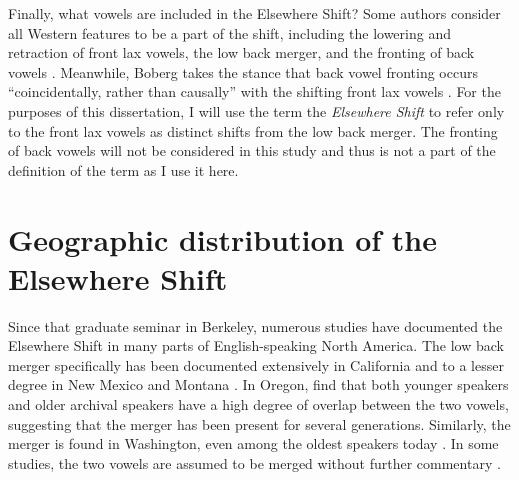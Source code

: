 Finally, what vowels are included in the Elsewhere Shift? Some authors consider all Western features to be a part of the shift, including the lowering and retraction of front lax vowels, the low back merger, and the fronting of back vowels \citep{eckert_2004, eckert_2011, podesva_2011, podesva_etal_2015, donofrio_etal_2017_pads, donofrio_etal_2019}. Meanwhile, Boberg takes the stance that back vowel fronting occurs ``coincidentally, rather than causally'' with the shifting front lax vowels \citet[12]{boberg_2019}. For the purposes of this dissertation, I will use the term the \textit{Elsewhere Shift} to refer only to the front lax vowels as distinct shifts from the low back merger. The fronting of back vowels will not be considered in this study and thus is not a part of the definition of the term as I use it here.




\section{Geographic distribution of the Elsewhere Shift}
\label{sec:geography_of_elsewhere_shift}

Since that graduate seminar in Berkeley, numerous studies have documented the Elsewhere Shift in many parts of English-speaking North America. The low back merger specifically has been documented extensively in California \citep{moonwomon_1991_diss, hagiwara_2005, holland_2014_diss} and to a lesser degree in New Mexico \citep{brumbaugh_koops_2017_pads} and Montana \citep[122]{bar_el_etal_2017}. In Oregon, \citet{mclarty_etal_2016} find that both younger speakers and older archival speakers have a high degree of overlap between the two vowels, suggesting that the merger has been present for several generations. Similarly, the merger is found in Washington, even among the oldest speakers today \citep{wassink_2015, wassink_2016_pads}. In some studies, the two vowels are assumed to be merged without further commentary \citep{eckert_2008, podesva_2011, kennedy_grama_2012}.

